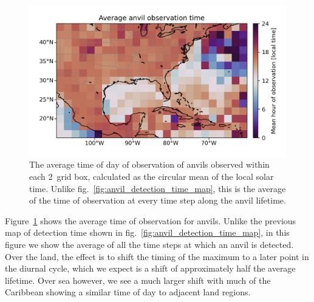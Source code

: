 \begin{figure}[tp]
    \centering
    \includegraphics[width=\textwidth]{figures/chapter2_25.png}
    \caption[
    A map showing the average time of observation of anvils
    ]{
    The average time of day of observation of anvils observed within each 2\textdegree\ grid box, calculated as the circular mean of the local solar time. Unlike fig.~\ref{fig:anvil_detection_time_map}, this is the average of the time of observation at every time step along the anvil lifetime.
    }
    \label{fig:anvil_observation_time_map}
\end{figure}

Figure~\ref{fig:anvil_observation_time_map} shows the average time of observation for anvils.
Unlike the previous map of detection time shown in fig.~\ref{fig:anvil_detection_time_map}, in this figure we show the average of all the time steps at which an anvil is detected.
Over the land, the effect is to shift the timing of the maximum to a later point in the diurnal cycle, which we expect is a shift of approximately half the average lifetime.
Over sea however, we see a much larger shift with much of the Caribbean showing a similar time of day to adjacent land regions.

